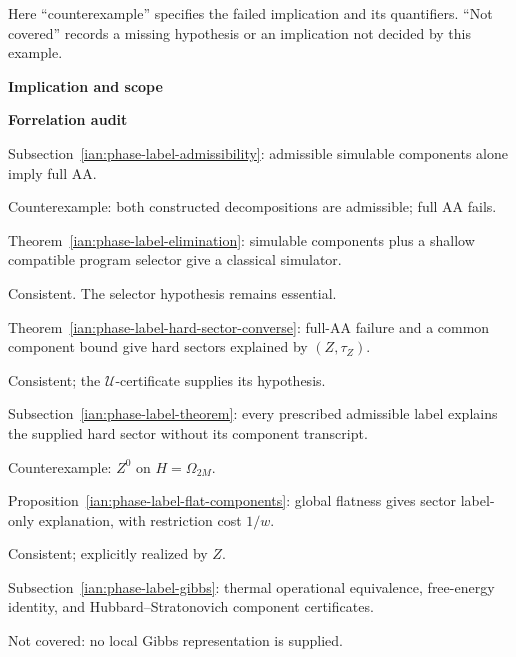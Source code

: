 \begin{remark}\label{ian:forrelation-implication-audit}
Here ``counterexample'' specifies the failed implication and its quantifiers. ``Not covered'' records a missing hypothesis or an implication not decided by this example.

\par\smallskip
\noindent
\parbox[t]{.70\linewidth}{\textbf{Implication and scope}}
\hfill
\parbox[t]{.26\linewidth}{\textbf{Forrelation audit}}
\par\smallskip

\noindent
\parbox[t]{.70\linewidth}{Subsection~\ref{ian:phase-label-admissibility}: admissible simulable components alone imply full AA.}
\hfill
\parbox[t]{.26\linewidth}{Counterexample: both constructed decompositions are admissible; full AA fails.}
\par\smallskip

\noindent
\parbox[t]{.70\linewidth}{Theorem~\ref{ian:phase-label-elimination}: simulable components plus a shallow compatible program selector give a classical simulator.}
\hfill
\parbox[t]{.26\linewidth}{Consistent. The selector hypothesis remains essential.}
\par\smallskip

\noindent
\parbox[t]{.70\linewidth}{Theorem~\ref{ian:phase-label-hard-sector-converse}: full-AA failure and a common component bound give hard sectors explained by \((Z,\tau_Z)\).}
\hfill
\parbox[t]{.26\linewidth}{Consistent; the \(\mathcal U\)-certificate supplies its hypothesis.}
\par\smallskip

\noindent
\parbox[t]{.70\linewidth}{Subsection~\ref{ian:phase-label-theorem}: every prescribed admissible label explains the supplied hard sector without its component transcript.}
\hfill
\parbox[t]{.26\linewidth}{Counterexample: \(Z^0\) on \(H=\Omega_{2M}\).}
\par\smallskip

\noindent
\parbox[t]{.70\linewidth}{Proposition~\ref{ian:phase-label-flat-components}: global flatness gives sector label-only explanation, with restriction cost \(1/w\).}
\hfill
\parbox[t]{.26\linewidth}{Consistent; explicitly realized by \(Z\).}
\par\smallskip

\noindent
\parbox[t]{.70\linewidth}{Subsection~\ref{ian:phase-label-gibbs}: thermal operational equivalence, free-energy identity, and Hubbard--Stratonovich component certificates.}
\hfill
\parbox[t]{.26\linewidth}{Not covered: no local Gibbs representation is supplied.}
\par\smallskip


\end{remark}
